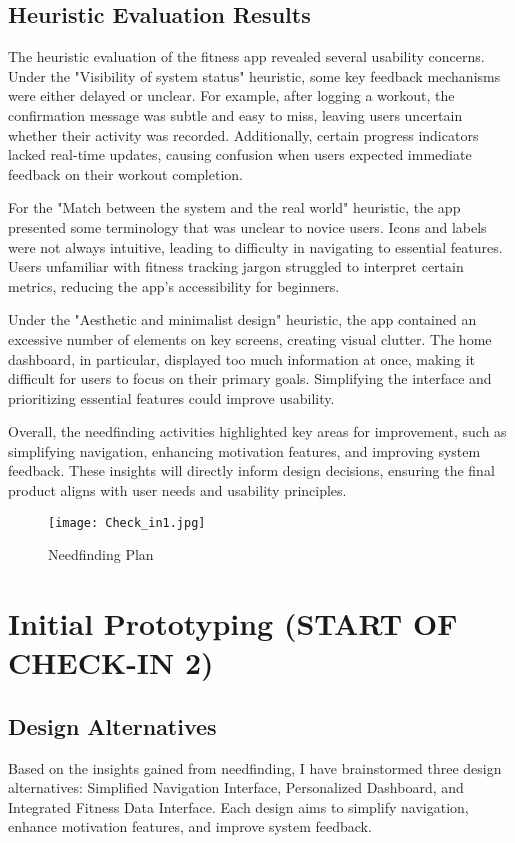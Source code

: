 \documentclass[
	letterpaper, %
]{jdf}
\begin{document}
\subsection {Heuristic Evaluation Results}
The heuristic evaluation of the fitness app revealed several usability concerns. Under the "Visibility of system status" heuristic, some key feedback mechanisms were either delayed or unclear. For example, after logging a workout, the confirmation message was subtle and easy to miss, leaving users uncertain whether their activity was recorded. Additionally, certain progress indicators lacked real-time updates, causing confusion when users expected immediate feedback on their workout completion.

For the "Match between the system and the real world" heuristic, the app presented some terminology that was unclear to novice users. Icons and labels were not always intuitive, leading to difficulty in navigating to essential features. Users unfamiliar with fitness tracking jargon struggled to interpret certain metrics, reducing the app’s accessibility for beginners.

Under the "Aesthetic and minimalist design" heuristic, the app contained an excessive number of elements on key screens, creating visual clutter. The home dashboard, in particular, displayed too much information at once, making it difficult for users to focus on their primary goals. Simplifying the interface and prioritizing essential features could improve usability.

Overall, the needfinding activities highlighted key areas for improvement, such as simplifying navigation, enhancing motivation features, and improving system feedback. These insights will directly inform design decisions, ensuring the final product aligns with user needs and usability principles.

\begin{figure}
    \centering
    \texttt{[image: Check\_in1.jpg]}
    \caption{Needfinding Plan}
    \label{fig:enter-label}
\end{figure}

\newpage

\section{Initial Prototyping (START OF CHECK-IN 2)}
\subsection{Design Alternatives}
Based on the insights gained from needfinding, I have brainstormed three design alternatives: Simplified Navigation Interface, Personalized Dashboard, and Integrated Fitness Data Interface. Each design aims to simplify navigation, enhance motivation features, and improve system feedback.
\end{document}
